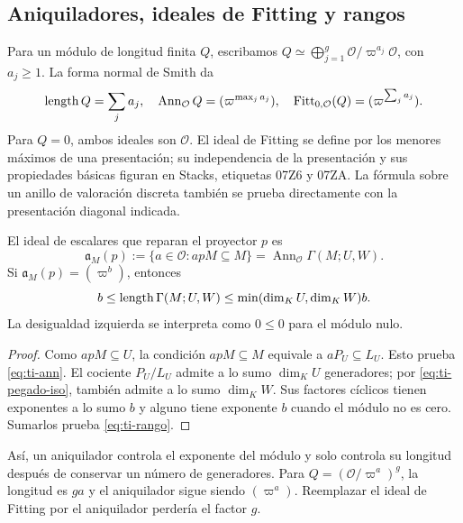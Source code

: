 \subsection{Aniquiladores, ideales de Fitting y rangos}

Para un módulo de longitud finita $Q$, escribamos
$Q\simeq\bigoplus_{j=1}^g\mathcal O/\varpi^{a_j}\mathcal O$,
con $a_j\ge1$. La forma normal de Smith da
\begin{equation}
 \operatorname{length} Q=\sum_j a_j,\quad
 \operatorname{Ann}_{\mathcal O}Q=(\varpi^{\max_j a_j}),\quad
 \operatorname{Fitt}_{0,\mathcal O}(Q)=(\varpi^{\sum_j a_j}).
 \label{eq:ti-fitt}
\end{equation}
Para $Q=0$, ambos ideales son $\mathcal O$.
El ideal de Fitting se define por los menores máximos de una
presentación; su independencia de la presentación y sus propiedades
básicas figuran en Stacks, etiquetas 07Z6 y 07ZA.
La fórmula sobre un anillo de valoración discreta también se prueba
directamente con la presentación diagonal indicada.

\begin{lema}
\label{lem:ti-ann}
El ideal de escalares que reparan el proyector $p$ es
\begin{equation}
 \mathfrak a_M(p):=\{a\in\mathcal O:apM\subseteq M\}
 =\operatorname{Ann}_{\mathcal O}\Gamma(M;U,W).
 \label{eq:ti-ann}
\end{equation}
Si $\mathfrak a_M(p)=(\varpi^b)$, entonces
\begin{equation}
 b\le\operatorname{length}\Gamma(M;U,W)
 \le\min(\dim_KU,\dim_KW)b.
 \label{eq:ti-rango}
\end{equation}
La desigualdad izquierda se interpreta como $0\le0$ para el
módulo nulo.
\end{lema}
\begin{proof}
Como $apM\subseteq U$, la condición $apM\subseteq M$ equivale
a $aP_U\subseteq L_U$. Esto prueba \eqref{eq:ti-ann}.
El cociente $P_U/L_U$ admite a lo sumo $\dim_KU$ generadores;
por \eqref{eq:ti-pegado-iso}, también admite a lo sumo
$\dim_KW$. Sus factores cíclicos tienen exponentes a lo sumo
$b$ y alguno tiene exponente $b$ cuando el módulo no es cero.
Sumarlos prueba \eqref{eq:ti-rango}.
\end{proof}

Así, un aniquilador controla el exponente del módulo y solo
controla su longitud después de conservar un número de generadores.
Para $Q=(\mathcal O/\varpi^a)^g$, la longitud es $ga$ y el
aniquilador sigue siendo $(\varpi^a)$. Reemplazar el ideal de
Fitting por el aniquilador perdería el factor $g$.

